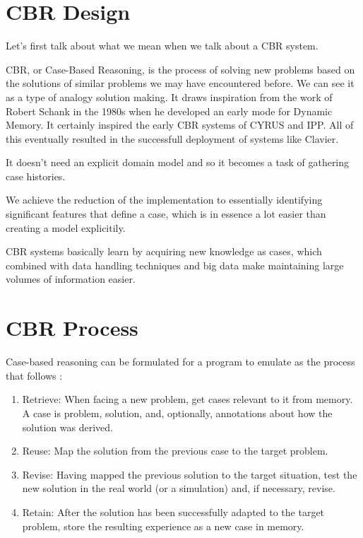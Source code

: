 \section{CBR Design}
\label{cap5:sec:introduccion}

Let's first talk about what we mean when we talk about a CBR system.\cite{Richter}

CBR, or Case-Based Reasoning, is the process of solving new problems based on the solutions of similar problems we may have encountered before.
We can see it as a type of analogy solution making. It draws inspiration from the work of Robert Schank in the 1980s when he developed an early mode for Dynamic Memory\cite{DBLP:books/daglib/0066738}.
It certainly inspired the early CBR systems of CYRUS\cite{Kolodner:83} and IPP\cite{Lebowitz:1983}. All of this eventually resulted in the successfull deployment of systems like Clavier\cite{CLAVIER}.

It doesn't need an explicit domain model and so it becomes a task of gathering case histories. 

We achieve the reduction of the implementation to essentially identifying significant features that define a case, which is in essence a lot easier than creating a model explicitily. 

CBR systems basically learn by acquiring new knowledge as cases, which combined with data handling techniques and big data make maintaining large volumes of information easier.

\section{CBR Process}
\label{cap5:sec:process}

Case-based reasoning can be formulated for a program to emulate as the process that follows \cite{AamodtPlaza}:

\begin{enumerate}
\item Retrieve: When facing a new problem, get cases relevant to it from memory. A case is problem, solution, and, optionally, annotations about how the solution was derived. 
\item Reuse: Map the solution from the previous case to the target problem. 
\item Revise: Having mapped the previous solution to the target situation, test the new solution in the real world (or a simulation) and, if necessary, revise. 
\item Retain: After the solution has been successfully adapted to the target problem, store the resulting experience as a new case in memory. 
\end{enumerate}

